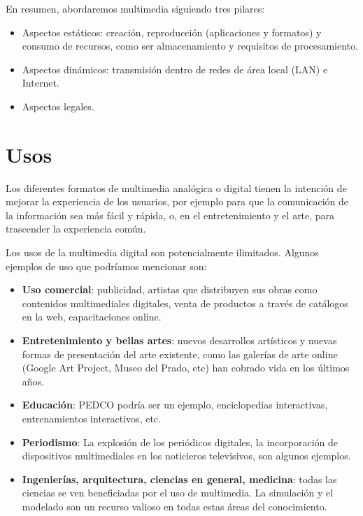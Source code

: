 \documentclass[12pt]{article}
\begin{document}
En resumen, abordaremos multimedia siguiendo tres pilares:
\begin{itemize}
\item Aspectos estáticos: creación, reproducción (aplicaciones y formatos) y 
consumo de recursos, como ser almacenamiento y requisitos de procesamiento. 
\item Aspectos dinámicos: transmisión dentro de redes de área local (LAN) e 
Internet. 
\item Aspectos legales.  
\end{itemize}

\section*{Usos}

Los diferentes formatos de multimedia analógica o digital tienen la 
intención de mejorar la experiencia de los usuarios, por ejemplo para 
que la comunicación de la información sea más fácil y rápida, o, en 
el entretenimiento y el arte, para trascender la experiencia común.\cite{wikipmmes} 

Los usos de la multimedia digital son potencialmente ilimitados. Algunos 
ejemplos de uso que podríamos mencionar son:  

\begin{itemize}
\item {\bf Uso comercial}: publicidad, artistas que distribuyen sus obras como contenidos 
multimediales digitales, venta de productos a través de catálogos en la web, capacitaciones online. 
\item {\bf Entretenimiento y bellas artes}: nuevos desarrollos artísticos y nuevas formas 
de presentación del arte existente, como las galerías de arte online (Google Art Project, 
Museo del Prado, etc) han cobrado vida en los últimos años.  
\item {\bf Educación}: PEDCO podría ser un ejemplo, enciclopedias interactivas, entrenamientos
interactivos, etc. 
\item {\bf Periodismo}: La explosión de los periódicos digitales, la incorporación de dispositivos 
multimediales en los noticieros televisivos, son algunos ejemplos. 
\item {\bf Ingenierías, arquitectura, ciencias en general, medicina}: todas las ciencias se ven 
beneficiadas por el uso de multimedia. La simulación y el modelado son un recurso 
valioso en todas estas áreas del conocimiento. 
\end{itemize}
\end{document}
